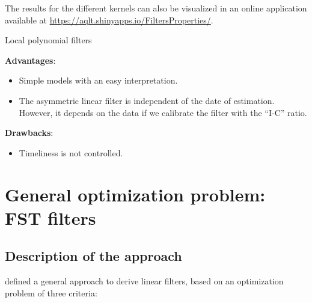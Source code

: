 \documentclass[
  12pt,
  ,
  a4paper]{article}
\providecommand{\tightlist}{%
  \setlength{\itemsep}{0pt}\setlength{\parskip}{0pt}}
\newcommand\1{\mathds{1}}
\begin{document}
The results for the different kernels can also be visualized in an online application available at \url{https://aqlt.shinyapps.io/FiltersProperties/}.

\begin{summary}{Local polynomial filters}

\textbf{Advantages}:

\begin{itemize}
\item
  Simple models with an easy interpretation.
\item
  The asymmetric linear filter is independent of the date of estimation.
  However, it depends on the data if we calibrate the filter with the ``I-C'' ratio.
\end{itemize}

\textbf{Drawbacks}:

\begin{itemize}
\tightlist
\item
  Timeliness is not controlled.
\end{itemize}

\end{summary}

\hypertarget{sec:GuggemosEtAl}{%
\section{General optimization problem: FST filters}\label{sec:GuggemosEtAl}}

\hypertarget{description-of-the-approach}{%
\subsection{Description of the approach}\label{description-of-the-approach}}

\textcite{ch15HBSA} defined a general approach to derive linear filters, based on an optimization problem of three criteria:
\end{document}
